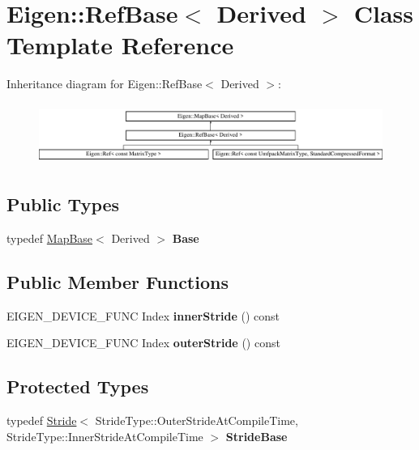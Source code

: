 \hypertarget{class_eigen_1_1_ref_base}{}\section{Eigen\+::Ref\+Base$<$ Derived $>$ Class Template Reference}
\label{class_eigen_1_1_ref_base}
Inheritance diagram for Eigen\+::Ref\+Base$<$ Derived $>$\+:\begin{figure}[H]
\begin{center}
\leavevmode
\includegraphics[height=2.019231cm]{class_eigen_1_1_ref_base}
\end{center}
\end{figure}
\subsection*{Public Types}
\begin{DoxyCompactItemize}
\item 
\mbox{\label{class_eigen_1_1_ref_base_af4cf7b03dd4f89bf2caf76776923d8ab}} 
typedef \mbox{\hyperlink{class_eigen_1_1_map_base}{Map\+Base}}$<$ Derived $>$ {\bfseries Base}
\end{DoxyCompactItemize}
\subsection*{Public Member Functions}
\begin{DoxyCompactItemize}
\item 
\mbox{\label{class_eigen_1_1_ref_base_a6b596948fd93da0ef5e860499bd378b6}} 
E\+I\+G\+E\+N\+\_\+\+D\+E\+V\+I\+C\+E\+\_\+\+F\+U\+NC Index {\bfseries inner\+Stride} () const
\item 
\mbox{\label{class_eigen_1_1_ref_base_ab16f2280abb4f0818e1f65e012b65585}} 
E\+I\+G\+E\+N\+\_\+\+D\+E\+V\+I\+C\+E\+\_\+\+F\+U\+NC Index {\bfseries outer\+Stride} () const
\end{DoxyCompactItemize}
\subsection*{Protected Types}
\begin{DoxyCompactItemize}
\item 
\mbox{\label{class_eigen_1_1_ref_base_aa04c323ef5f01e4900cbd375cb850662}} 
typedef \mbox{\hyperlink{class_eigen_1_1_stride}{Stride}}$<$ Stride\+Type\+::\+Outer\+Stride\+At\+Compile\+Time, Stride\+Type\+::\+Inner\+Stride\+At\+Compile\+Time $>$ {\bfseries Stride\+Base}
\end{DoxyCompactItemize}
